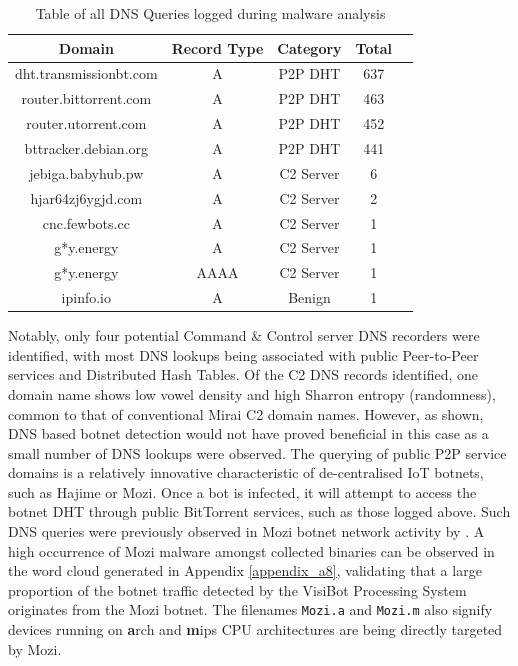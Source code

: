 \begin{table}[!htb]
    \centering
    \caption{Table of all DNS Queries logged during malware analysis}
    \label{tab:dns_queries}
    \begin{tabular}{|c|c|c|c|c|}
    \hline
    \textbf{Domain} & \textbf{Record Type} & \textbf{Category} & \textbf{Total} \\ \hline
    dht.transmissionbt.com & A    & P2P DHT & 637 \\ \hline
    router.bittorrent.com  & A    & P2P DHT &  463 \\ \hline
    router.utorrent.com    & A    & P2P DHT &  452 \\ \hline
    bttracker.debian.org   & A    & P2P DHT &  441 \\ \hline
    jebiga.babyhub.pw      & A    & C2 Server &  6 \\ \hline
    hjar64zj6ygjd.com      & A    & C2 Server  &  2 \\ \hline
    cnc.fewbots.cc         & A    & C2 Server  &  1 \\ \hline
    g*y.energy             & A    & C2 Server  &  1 \\ \hline
    g*y.energy             & AAAA & C2 Server  &  1 \\ \hline
    ipinfo.io              & A    & Benign &  1 \\ \hline
    \end{tabular}
\end{table}

Notably, only four potential Command \& Control server DNS recorders were identified, with most DNS lookups being associated with public Peer-to-Peer services and Distributed Hash Tables. Of the C2 DNS records identified, one domain name shows low vowel density and high Sharron entropy (randomness), common to that of conventional Mirai C2 domain names. \citet{Dwyer2019} However, as shown,  DNS based botnet detection would not have proved beneficial in this case as a small number of DNS lookups were observed. The querying of public P2P service domains is a relatively innovative characteristic of de-centralised IoT botnets, such as Hajime or Mozi. Once a bot is infected, it will attempt to access the botnet DHT through public BitTorrent services, such as those logged above. Such DNS queries were previously observed in Mozi botnet network activity by \citep{Netlab2019}. A high occurrence of Mozi malware amongst collected binaries can be observed in the word cloud generated in Appendix \ref{appendix_a8}, validating that a large proportion of the botnet traffic detected by the VisiBot Processing System originates from the Mozi botnet. The filenames \texttt{Mozi.a} and \texttt{Mozi.m} also signify devices running on \textbf{a}rch and \textbf{m}ips CPU architectures are being directly targeted by Mozi. 


